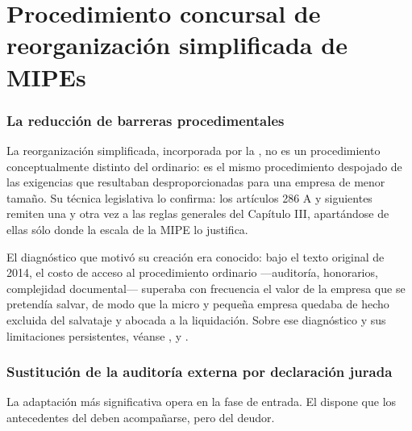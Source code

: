 \chapter{Procedimiento concursal de reorganización simplificada de MIPEs}
\label{cap:reorganizacion-simplificada}


\bloqueTeorico

\subsection{La reducción de barreras procedimentales}

La reorganización simplificada, incorporada por la \Lreforma{} \citeyearpar{ley-21563}, no
es un procedimiento conceptualmente distinto del ordinario: es el mismo procedimiento
despojado de las exigencias que resultaban desproporcionadas para una empresa de menor
tamaño. Su técnica legislativa lo confirma: los artículos 286 A y siguientes remiten una y
otra vez a las reglas generales del Capítulo III, apartándose de ellas sólo donde la escala
de la MIPE lo justifica.

El diagnóstico que motivó su creación era conocido: bajo el texto original de 2014, el
costo de acceso al procedimiento ordinario ---auditoría, honorarios, complejidad
documental--- superaba con frecuencia el valor de la empresa que se pretendía salvar, de
modo que la micro y pequeña empresa quedaba de hecho excluida del salvataje y abocada a la
liquidación. Sobre ese diagnóstico y sus limitaciones persistentes, véanse
\textcite{aj-ley21563}, \textcite{prensa-df-brechas-mypes} y \textcite{prensa-exante-lavin}.

\subsection{Sustitución de la auditoría externa por declaración jurada}

La adaptación más significativa opera en la fase de entrada. El  dispone que los
antecedentes del  deben acompañarse, pero  del deudor.


